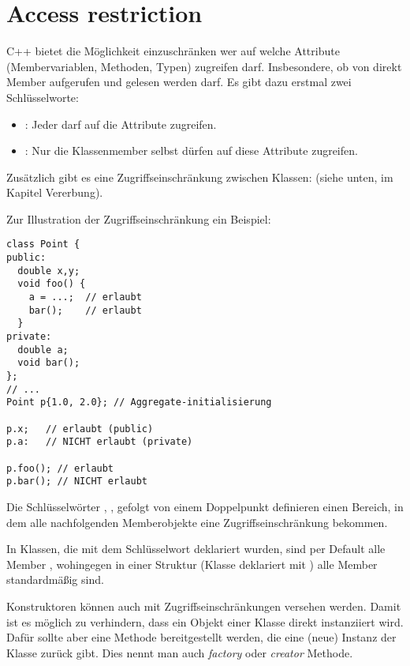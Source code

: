 \section{Access restriction\label{sec:access-restriction}}
C++ bietet die Möglichkeit einzuschränken wer auf welche Attribute (Membervariablen, Methoden, Typen) zugreifen darf. Insbesondere, ob von direkt Member aufgerufen und gelesen werden darf. Es gibt dazu erstmal zwei Schlüsselworte:
\begin{itemize}
	\item {}: Jeder darf auf die Attribute zugreifen.
	\item {}: Nur die Klassenmember selbst dürfen auf diese Attribute zugreifen.
\end{itemize}
Zusätzlich gibt es eine Zugriffseinschränkung zwischen Klassen:  (siehe unten, im Kapitel Vererbung).

\begin{example}
Zur Illustration der Zugriffseinschränkung ein Beispiel:
\begin{verbatim}
class Point {
public:
  double x,y;
  void foo() {
    a = ...;  // erlaubt
    bar();    // erlaubt
  }
private:
  double a;
  void bar();
};
// ...
Point p{1.0, 2.0}; // Aggregate-initialisierung

p.x;   // erlaubt (public)
p.a:   // NICHT erlaubt (private)

p.foo(); // erlaubt
p.bar(); // NICHT erlaubt
\end{verbatim}
\end{example}

Die Schlüsselwörter , ,  gefolgt von einem Doppelpunkt definieren einen Bereich, in dem alle nachfolgenden Memberobjekte eine Zugriffseinschränkung bekommen.

\begin{rem}
In Klassen, die mit dem Schlüsselwort  deklariert wurden, sind per Default alle Member , wohingegen in einer Struktur (Klasse deklariert mit ) alle Member standardmäßig  sind.
\end{rem}

\begin{rem} Konstruktoren können auch mit Zugriffseinschränkungen versehen werden. Damit ist es möglich zu verhindern, dass ein Objekt einer Klasse direkt instanziiert wird. Dafür sollte aber eine Methode bereitgestellt werden, die eine (neue) Instanz der Klasse zurück gibt. Dies nennt man auch \emph{factory} oder \emph{creator} Methode.\end{rem}


